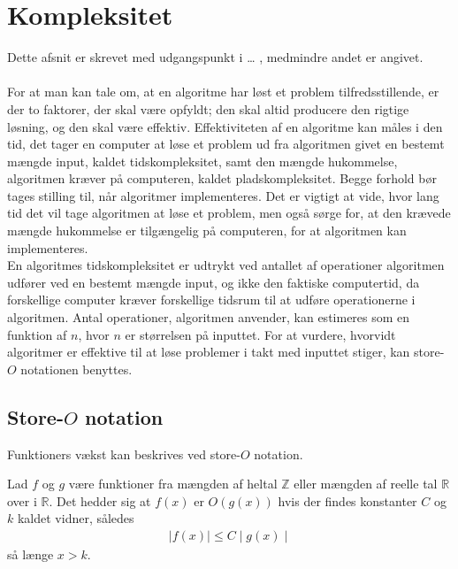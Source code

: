 \chapter{Kompleksitet}
Dette afsnit er skrevet med udgangspunkt i … , medmindre andet er angivet. \\ \\
For at man kan tale om, at en algoritme har løst et problem tilfredsstillende, er der to faktorer, der skal være opfyldt; den skal altid producere den rigtige løsning, og den skal være effektiv. 
Effektiviteten af en algoritme kan måles i den tid, det tager en computer at løse et problem ud fra algoritmen givet en bestemt mængde input, kaldet tidskompleksitet, samt den mængde hukommelse, algoritmen kræver på computeren, kaldet pladskompleksitet. 
Begge forhold bør tages stilling til, når algoritmer implementeres.
Det er vigtigt at vide, hvor lang tid det vil tage algoritmen at løse et problem, men også sørge for, at den krævede mængde hukommelse er tilgængelig på computeren, for at algoritmen kan implementeres. \\ 
En algoritmes tidskompleksitet er udtrykt ved antallet af operationer algoritmen udfører ved en bestemt mængde input, og ikke den faktiske computertid, da forskellige computer kræver forskellige tidsrum til at udføre operationerne i algoritmen. 
Antal operationer, algoritmen anvender, kan estimeres som en funktion af $n$, hvor $n$ er størrelsen på inputtet. 
For at vurdere, hvorvidt algoritmer er effektive til at løse problemer i takt med inputtet stiger, kan store-$O$ notationen benyttes.

\section{Store-$O$ notation}
Funktioners vækst kan beskrives ved store-$O$ notation. \\
\begin{defn}
	Lad $f$ og $g$ være funktioner fra mængden af heltal $\mathbb{Z}$ eller mængden af reelle tal $\mathbb{R}$ over i $\mathbb{R}$. 
	Det hedder sig at $f(x)$ er $O(g(x))$ hvis der findes konstanter $C$ og $k$ kaldet vidner, således 
\begin{align*}
\mid f(x) \mid \leq C \mid g(x) \mid
\end{align*}
så længe $x>k$.
\end{defn}

